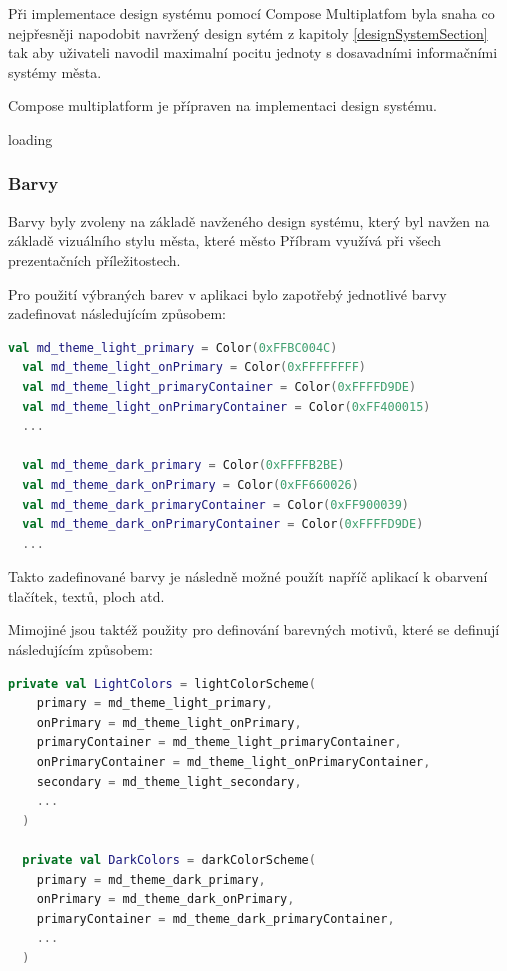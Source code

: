 Při implementace design systému pomocí Compose Multiplatfom byla snaha co nejpřesněji napodobit navržený design sytém z kapitoly \ref{designSystemSection}
tak aby uživateli navodil maximalní pocitu jednoty s dosavadními informačními systémy města.


Compose multiplatform je přípraven na implementaci design systému. 

loading


\subsubsection{Barvy} \label{colorSection}
Barvy byly zvoleny na základě navženého design systému, který byl navžen na základě vizuálního stylu města, které město 
Příbram využívá při všech prezentačních příležitostech.

Pro použití výbraných barev v aplikaci bylo zapotřebý jednotlivé barvy zadefinovat následujícím způsobem:

\begin{lstlisting}[caption={Zadefinování barev}, label={lst:ComposeCode}, language=Kotlin]
  val md_theme_light_primary = Color(0xFFBC004C)
  val md_theme_light_onPrimary = Color(0xFFFFFFFF)
  val md_theme_light_primaryContainer = Color(0xFFFFD9DE)
  val md_theme_light_onPrimaryContainer = Color(0xFF400015)
  ...

  val md_theme_dark_primary = Color(0xFFFFB2BE)
  val md_theme_dark_onPrimary = Color(0xFF660026)
  val md_theme_dark_primaryContainer = Color(0xFF900039)
  val md_theme_dark_onPrimaryContainer = Color(0xFFFFD9DE)
  ...
\end{lstlisting}

Takto zadefinované barvy je následně možné použít napříč aplikací k obarvení tlačítek, textů, ploch atd.

Mimojiné jsou taktéž použity pro definování barevných motivů, které se definují následujícím způsobem:

\begin{lstlisting}[caption={Definice barevných motivů}, label={lst:ComposeCode}, language=Kotlin]
  private val LightColors = lightColorScheme(
    primary = md_theme_light_primary,
    onPrimary = md_theme_light_onPrimary,
    primaryContainer = md_theme_light_primaryContainer,
    onPrimaryContainer = md_theme_light_onPrimaryContainer,
    secondary = md_theme_light_secondary,
    ...
  )

  private val DarkColors = darkColorScheme(
    primary = md_theme_dark_primary,
    onPrimary = md_theme_dark_onPrimary,
    primaryContainer = md_theme_dark_primaryContainer,
    ...
  )
\end{lstlisting}

